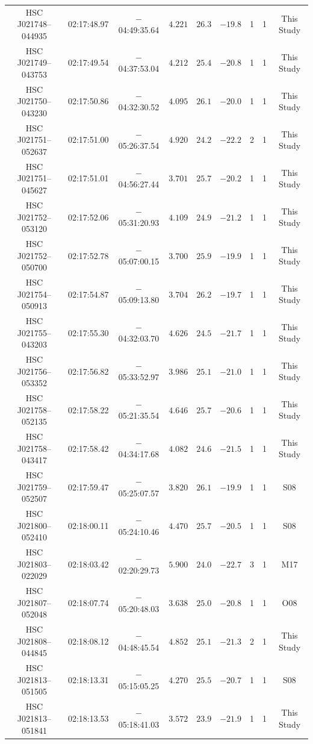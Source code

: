 \documentclass[]{pasj01}
\begin{document}
{\begin{longtable}{ccccccccc}
HSC J021748--044935 & 02:17:48.97 & $-$04:49:35.64 & $4.221$ & $26.3$ & $-19.8$ & 1 & 1 & This Study \\
HSC J021749--043753 & 02:17:49.54 & $-$04:37:53.04 & $4.212$ & $25.4$ & $-20.8$ & 1 & 1 & This Study \\
HSC J021750--043230 & 02:17:50.86 & $-$04:32:30.52 & $4.095$ & $26.1$ & $-20.0$ & 1 & 1 & This Study \\
HSC J021751--052637 & 02:17:51.00 & $-$05:26:37.54 & $4.920$ & $24.2$ & $-22.2$ & 2 & 1 & This Study \\
HSC J021751--045627 & 02:17:51.01 & $-$04:56:27.44 & $3.701$ & $25.7$ & $-20.2$ & 1 & 1 & This Study \\
HSC J021752--053120 & 02:17:52.06 & $-$05:31:20.93 & $4.109$ & $24.9$ & $-21.2$ & 1 & 1 & This Study \\
HSC J021752--050700 & 02:17:52.78 & $-$05:07:00.15 & $3.700$ & $25.9$ & $-19.9$ & 1 & 1 & This Study \\
HSC J021754--050913 & 02:17:54.87 & $-$05:09:13.80 & $3.704$ & $26.2$ & $-19.7$ & 1 & 1 & This Study \\
HSC J021755--043203 & 02:17:55.30 & $-$04:32:03.70 & $4.626$ & $24.5$ & $-21.7$ & 1 & 1 & This Study \\
HSC J021756--053352 & 02:17:56.82 & $-$05:33:52.97 & $3.986$ & $25.1$ & $-21.0$ & 1 & 1 & This Study \\
HSC J021758--052135 & 02:17:58.22 & $-$05:21:35.54 & $4.646$ & $25.7$ & $-20.6$ & 1 & 1 & This Study \\
HSC J021758--043417 & 02:17:58.42 & $-$04:34:17.68 & $4.082$ & $24.6$ & $-21.5$ & 1 & 1 & This Study \\
HSC J021759--052507 & 02:17:59.47 & $-$05:25:07.57 & $3.820$ & $26.1$ & $-19.9$ & 1 & 1 & S08 \\
HSC J021800--052410 & 02:18:00.11 & $-$05:24:10.46 & $4.470$ & $25.7$ & $-20.5$ & 1 & 1 & S08 \\
HSC J021803--022029 & 02:18:03.42 & $-$02:20:29.73 & $5.900$ & $24.0$ & $-22.7$ & 3 & 1 & M17 \\
HSC J021807--052048 & 02:18:07.74 & $-$05:20:48.03 & $3.638$ & $25.0$ & $-20.8$ & 1 & 1 & O08 \\
HSC J021808--044845 & 02:18:08.12 & $-$04:48:45.54 & $4.852$ & $25.1$ & $-21.3$ & 2 & 1 & This Study \\
HSC J021813--051505 & 02:18:13.31 & $-$05:15:05.25 & $4.270$ & $25.5$ & $-20.7$ & 1 & 1 & S08 \\
HSC J021813--051841 & 02:18:13.53 & $-$05:18:41.03 & $3.572$ & $23.9$ & $-21.9$ & 1 & 1 & This Study \\

\end{longtable}}
\end{document}
